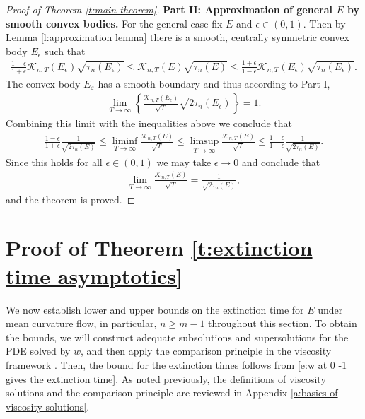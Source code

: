 \documentclass[reqno]{amsart}
\numberwithin{equation}{section}
\begin{document}
\begin{proof}[Proof of Theorem \ref{t:main theorem}]
 \textbf{Part II: Approximation of general $E$ by smooth convex bodies.} For the general case fix $E$ and $\epsilon\in(0,1)$. Then by Lemma \ref{l:approximation lemma} there is a smooth, centrally symmetric convex body $E_\epsilon$ such that 
    \begin{align*}
      \frac{1-\epsilon}{1+\epsilon} \mathcal{K}_{n,T}(E_\epsilon)\sqrt{\tau_n(E_\epsilon)} \leq \mathcal{K}_{n,T}(E)\sqrt{\tau_n(E)} \leq  \frac{1+\epsilon}{1-\epsilon} \mathcal{K}_{n,T}(E_\epsilon)\sqrt{\tau_n(E_\epsilon)}.    
    \end{align*}
  The convex body $E_\varepsilon$ has a smooth boundary and thus according to Part I, 
  \begin{align*}
    \lim_{T\to \infty}\left \{ \frac{\mathcal{K}_{n,T}(E_\epsilon)}{\sqrt{T}}\sqrt{2\tau_n(E_\epsilon)} \right \} = 1.   
  \end{align*}
  Combining this limit with the inequalities above we conclude that 
  \begin{align*}
   \frac{1-\epsilon}{1+\epsilon}\frac{1}{\sqrt{2\tau_n(E)}}\leq \liminf_{T\to \infty}\frac{\mathcal{K}_{n,T}(E)}{\sqrt{T}}\leq \limsup_{T\to \infty}\frac{\mathcal{K}_{n,T}(E)}{\sqrt{T}} \leq \frac{1+\epsilon}{1-\epsilon}\frac{1}{\sqrt{2\tau_n(E)}}.
  \end{align*}
  Since this holds for all $\epsilon\in(0,1)$ we may take $\epsilon \to 0$ and conclude that
  \begin{align*}
    \lim_{T\to \infty}\frac{\mathcal{K}_{n,T}(E)}{\sqrt{T}} = \frac{1}{\sqrt{2\tau_n(E)}},
  \end{align*}
  and the theorem is proved.
\end{proof}



\section{Proof of Theorem \ref{t:extinction time asymptotics}}\label{s:analysis of the extinction time}

We now establish lower and upper bounds on the extinction time for $E$ under mean curvature flow, in particular, $n\geq m-1$ throughout this section. To obtain the bounds, we will construct adequate subsolutions and supersolutions for the PDE solved by $w$, and then apply the comparison principle in the viscosity framework \cite[Theorem 3.2]{EvansSpruck1991}. Then, the bound for the extinction times follows from \eqref{e:w at 0 -1 gives the extinction time}. As noted previously, the definitions of viscosity solutions and the comparison principle are reviewed in Appendix \ref{a:basics of viscosity solutions}.
\end{document}
